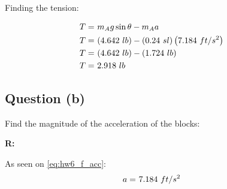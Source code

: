 		Finding the tension:

		\begin{align}
			T = \ &m_{A}g \sin \theta - m_{A}a& \notag \\
			T = \ &(4.642 \ lb) - (0.24 \ sl)\left(7.184 \ ft/s^{2}\right)& \notag \\
			T = \ &(4.642 \ lb) - (1.724 \ lb)& \notag \\
			T = \ &2.918 \ lb&
		\end{align}

	\subsection{Question (b)}

		Find the magnitude of the acceleration of the blocks:

		\textbf{R:} \newline

		As seen on \cref{eq:hw6_f_acc}:
		\begin{align}
			a = \ &7.184 \ ft/s^{2}& \notag
		\end{align}
